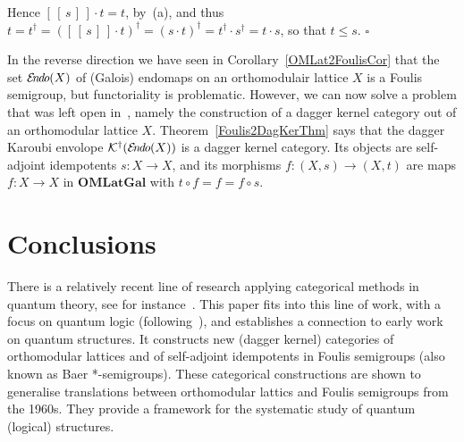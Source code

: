 \documentclass{article}
\newcommand{\QEDbox}{\square}
\newcommand{\QED}{\hspace*{\fill}$\QEDbox$}
\newcommand{\after}{\mathrel{\circ}}
\newcommand{\Cat}[1]{\ensuremath{\mathbf{#1}}}
\newcommand{\dagKaroubi}[1]{{\cal K}^{\dag}(#1)}
\newcommand{\sai}[1]{[\,#1\,]}
\newcommand{\EndoHom}[1]{{\cal E}{\kern-.5ex}\textit{n}{\kern-.2ex}\textit{d}{\kern-.2ex}\textit{o}(#1)}
\begin{document}
{\begin{enumerate}
\noindent Hence $\sai{\sai{s}}\cdot t = t$, by~(a), and thus $t = t^{\dag}
= (\sai{\sai{s}}\cdot t)^{\dag} = (s\cdot t)^{\dag} = t^{\dag} \cdot
s^{\dag} = t\cdot s$, so that $t\leq s$. \QED
\end{enumerate}
}


In the reverse direction we have seen in
Corollary~\ref{OMLat2FoulisCor} that the set $\EndoHom{X}$ of (Galois)
endomaps on an orthomodulair lattice $X$ is a Foulis semigroup, but
functoriality is problematic. However, we can now solve a problem that
was left open in~\cite{HeunenJ09a}, namely the construction of a
dagger kernel category out of an orthomodular lattice
$X$. Theorem~\ref{Foulis2DagKerThm} says that the dagger Karoubi
envolope $\dagKaroubi{\EndoHom{X}}$ is a dagger kernel category. Its
objects are self-adjoint idempotents $s\colon X\rightarrow X$, and its
morphisms $f\colon (X,s)\rightarrow (X,t)$ are maps $f\colon
X\rightarrow X$ in \Cat{OMLatGal} with $t \after f = f = f\after s$.



\section{Conclusions}\label{ConclusionSec}

There is a relatively recent line of research applying categorical
methods in quantum theory, see for
instance~\cite{ButterfieldI98,AbramskyC04,Selinger07,DoeringI08,HeunenLS09,CoeckePV09}. This
paper fits into this line of work, with a focus on quantum logic
(following~\cite{HeunenJ09a}), and establishes a connection to early
work on quantum structures. It constructs new (dagger kernel)
categories of orthomodular lattices and of self-adjoint idempotents in
Foulis semigroups (also known as Baer *-semigroups). These categorical
constructions are shown to generalise translations between
orthomodular lattics and Foulis semigroups from the 1960s.  They
provide a framework for the systematic study of quantum (logical)
structures.
\end{document}
